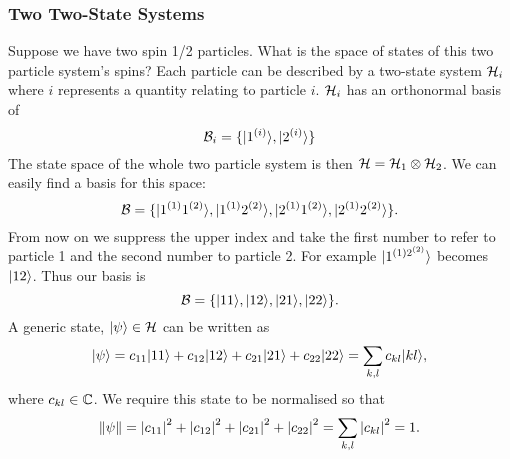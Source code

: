     \subsubsection{Two Two-State Systems}
    Suppose we have two spin 1/2 particles.
    What is the space of states of this two particle system's spins?
    Each particle can be described by a two-state system \(\mathcal{H}_i\) where \(i\) represents a quantity relating to particle \(i\).
    \(\mathcal{H}_i\) has an orthonormal basis of
    \[\mathcal{B}_i = \{\vert {1^{(i)}} \rangle, \vert {2^{(i)}} \rangle\}\]
    The state space of the whole two particle system is then \(\mathcal{H} = \mathcal{H}_1 \otimes \mathcal{H}_2\).
    We can easily find a basis for this space:
    \[\mathcal{B} = \{\vert {1^{(1)}1^{(2)}} \rangle, \vert {1^{(1)}2^{(2)}} \rangle, \vert {2^{(1)}1^{(2)}} \rangle, \vert {2^{(1)}2^{(2)}} \rangle\}.\]
    From now on we suppress the upper index and take the first number to refer to particle 1 and the second number to particle 2.
    For example \(\vert {1^{(1)2^{(2)}}} \rangle\) becomes \(\vert {12} \rangle\).
    Thus our basis is
    \[\mathcal{B} = \{\vert {11} \rangle, \vert {12} \rangle, \vert {21} \rangle, \vert {22} \rangle\}.\]
    A generic state, \(\vert {\psi} \rangle\in\mathcal{H}\) can be written as
    \[\vert {\psi} \rangle = c_{11}\vert {11} \rangle + c_{12}\vert {12} \rangle + c_{21}\vert {21} \rangle + c_{22}\vert {22} \rangle = \sum_{k, l}c_{kl}\vert {kl} \rangle,\]
    where \(c_{kl}\in\mathbb{C}\).
    We require this state to be normalised so that
    \[\norm{\psi} = \abs{c_{11}}^2 + \abs{c_{12}}^2 + \abs{c_{21}}^2 + \abs{c_{22}}^2 = \sum_{k, l}\abs{c_{kl}}^2 = 1.\]
    
